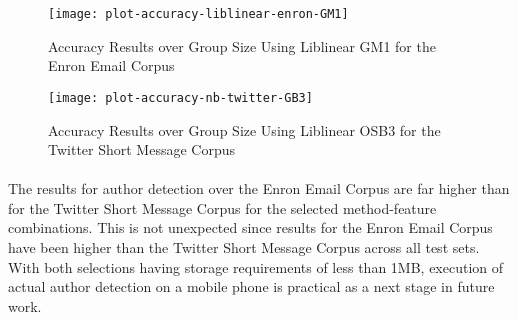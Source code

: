 \begin{figure}[htbp!]
	\begin{center}
	\centering
	\texttt{[image: plot-accuracy-liblinear-enron-GM1]}
	\caption{Accuracy Results over Group Size Using Liblinear GM1 for the Enron Email Corpus}
	\label{fig:accuracy-liblinear-enron-GM1-over-groups}
	\end{center}
\end{figure}

\begin{figure}[htbp!]
	\begin{center}
	\centering
	\texttt{[image: plot-accuracy-nb-twitter-GB3]}
	\caption{Accuracy Results over Group Size Using Liblinear OSB3 for the Twitter Short Message Corpus}
	\label{fig:accuracy-liblinear-twitter-OSB3-over-groups}
	\end{center}
\end{figure}

\paragraph*{} The results for author detection over the Enron Email Corpus are far higher than for the Twitter Short Message Corpus for the selected method-feature combinations.  This is not unexpected since results for the Enron Email Corpus have been higher than the Twitter Short Message Corpus across all test sets.  With both selections having storage requirements of less than 1MB, execution of actual author detection on a mobile phone is practical as a next stage in future work.
